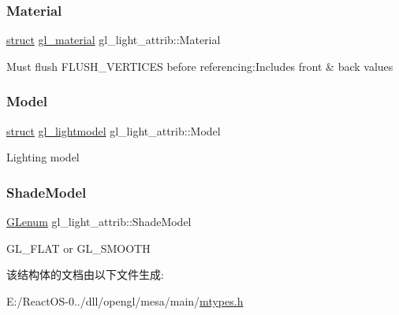 \subsubsection{\texorpdfstring{Material}{Material}}
{\footnotesize\ttfamily \hyperlink{interfacestruct}{struct} \hyperlink{structgl__material}{gl\+\_\+material} gl\+\_\+light\+\_\+attrib\+::\+Material}

Must flush F\+L\+U\+S\+H\+\_\+\+V\+E\+R\+T\+I\+C\+ES before referencing\+:Includes front \& back values \mbox{\label{structgl__light__attrib_a9248638db24a85cf31b6304346c35806}} 
\subsubsection{\texorpdfstring{Model}{Model}}
{\footnotesize\ttfamily \hyperlink{interfacestruct}{struct} \hyperlink{structgl__lightmodel}{gl\+\_\+lightmodel} gl\+\_\+light\+\_\+attrib\+::\+Model}

Lighting model \mbox{\label{structgl__light__attrib_a0c17126359bd9fa67abd5bffe18d7036}} 
\subsubsection{\texorpdfstring{Shade\+Model}{ShadeModel}}
{\footnotesize\ttfamily \hyperlink{interfacevoid}{G\+Lenum} gl\+\_\+light\+\_\+attrib\+::\+Shade\+Model}

G\+L\+\_\+\+F\+L\+AT or G\+L\+\_\+\+S\+M\+O\+O\+TH 

该结构体的文档由以下文件生成\+:\begin{DoxyCompactItemize}
\item 
E\+:/\+React\+O\+S-\/0../dll/opengl/mesa/main/\hyperlink{mtypes_8h}{mtypes.\+h}\end{DoxyCompactItemize}
